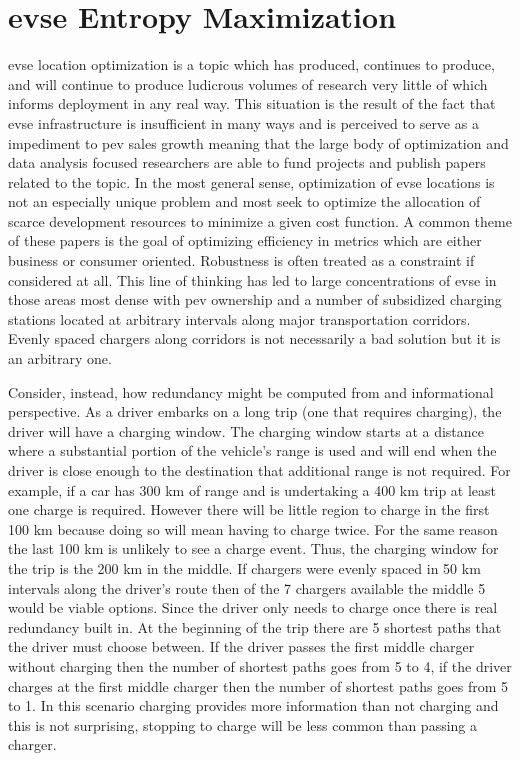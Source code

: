 \section{\gls{evse} Entropy Maximization}

\gls{evse} location optimization is a topic which has produced, continues to produce, and will continue to produce ludicrous volumes of research very little of which informs deployment in any real way. This situation is the result of the fact that \gls{evse} infrastructure is insufficient in many ways and is perceived to serve as a impediment to \gls{pev} sales growth meaning that the large body of optimization and data analysis focused researchers are able to fund projects and publish papers related to the topic. In the most general sense, optimization of \gls{evse} locations is not an especially unique problem and most seek to optimize the allocation of scarce development resources to minimize a given cost function. A common theme of these papers is the goal of optimizing efficiency in metrics which are either business or consumer oriented. Robustness is often treated as a constraint if considered at all. This line of thinking has led to large concentrations of \gls{evse} in those areas most dense with \gls{pev} ownership and a number of subsidized charging stations located at arbitrary intervals along major transportation corridors. Evenly spaced chargers along corridors is not necessarily a bad solution but it is an arbitrary one.

Consider, instead, how redundancy might be computed from and informational perspective. As a driver embarks on a long trip (one that requires charging), the driver will have a charging window. The charging window starts at a distance where a substantial portion of the vehicle's range is used and will end when the driver is close enough to the destination that additional range is not required. For example, if a car has 300 km of range and is undertaking a 400 km trip at least one charge is required. However there will be little region to charge in the first 100 km because doing so will mean having to charge twice. For the same reason the last 100 km is unlikely to see a charge event. Thus, the charging window for the trip is the 200 km in the middle. If chargers were evenly spaced in 50 km intervals along the driver's route then of the 7 chargers available the middle 5 would be viable options. Since the driver only needs to charge once there is real redundancy built in. At the beginning of the trip there are 5 shortest paths that the driver must choose between. If the driver passes the first middle charger without charging then the number of shortest paths goes from 5 to 4, if the driver charges at the first middle charger then the number of shortest paths goes from 5 to 1. In this scenario charging provides more information than not charging and this is not surprising, stopping to charge will be less common than passing a charger.

